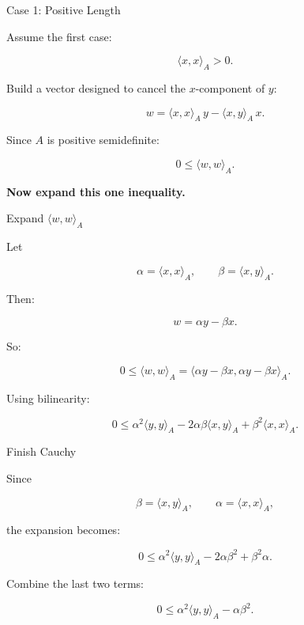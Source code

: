 \documentclass[10pt]{beamer}
\theoremstyle{definition}
\newcommand{\x}[1]{\alert{\textbf{#1}}}
\begin{document}
\begin{frame}{Case 1: Positive Length}

Assume the first case:

$$
\langle x,x\rangle_A>0.
$$

\vfill

Build a vector designed to cancel the $x$-component of $y$:

$$
w=\langle x,x\rangle_A\,y-\langle x,y\rangle_A\,x.
$$

\vfill

Since $A$ is positive semidefinite:

$$
0\le \langle w,w\rangle_A.
$$

\vfill

\begin{center}
\x{Now expand this one inequality.}
\end{center}

\end{frame}


\begin{frame}{Expand $\langle w,w\rangle_A$}

Let

$$
\alpha=\langle x,x\rangle_A,
\qquad
\beta=\langle x,y\rangle_A.
$$

\vfill

Then:

$$
w=\alpha y-\beta x.
$$

\vfill

So:

$$
0\le\langle w,w\rangle_A
=\langle \alpha y-\beta x,\alpha y-\beta x\rangle_A.
$$

\vfill

Using bilinearity:

$$
0\le \alpha^2\langle y,y\rangle_A-2\alpha\beta\langle x,y\rangle_A+\beta^2\langle x,x\rangle_A.
$$

\end{frame}


\begin{frame}{Finish Cauchy}

Since

$$
\beta=\langle x,y\rangle_A,
\qquad
\alpha=\langle x,x\rangle_A,
$$

the expansion becomes:

$$
0\le
\alpha^2\langle y,y\rangle_A
-2\alpha\beta^2
+\beta^2\alpha.
$$

\vfill

Combine the last two terms:

$$
0\le
\alpha^2\langle y,y\rangle_A-\alpha\beta^2.
$$

\end{frame}
\end{document}
